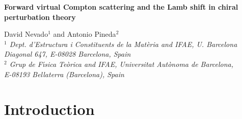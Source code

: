 \documentclass[a4paper,12pt]{article}
\begin{document}
\begin{titlepage}
\begin{flushright}
\end{flushright}


\vspace{1cm}
\begin{center}
\begin{Large}
{\bf Forward virtual Compton scattering and the Lamb shift 
in chiral perturbation theory}\\[2cm] 
\end{Large} 
{\large David Nevado$^{1}$ and Antonio Pineda$^{2}$}\\
\vspace{0.5cm}
{\it $^{1}$ Dept. d'Estructura i Constituents de la Mat\`eria and IFAE,
U. Barcelona \\ Diagonal 647, E-08028 Barcelona, Spain}\\
\vspace{0.5cm}
{\it $^{2}$ Grup de F\'\i sica 
Te\`orica and IFAE, Universitat Aut\`onoma de Barcelona,\\ 
E-08193 Bellaterra (Barcelona), Spain}
\end{center}

\vspace{1cm}

\begin{abstract}
We compute the spin-independent 
structure functions of the forward virtual-photon Compton 
tensor of the proton at one loop using heavy baryon chiral  
perturbation theory and dispersion relations. We study 
 the relation between both approaches. We use these results 
to generalize some sum rules to virtual photon transfer momentum and 
relate them with sum rules in deep inelastic scattering. 
We then compute the leading chiral 
term of the polarizability correction to the 
 Lamb shift of the hydrogen and 
muonic hydrogen. We obtain $-{87.05}/{n^3}\,{\rm Hz}$ and $-{0.148}/{n^3}\,{\rm meV}$ 
for the correction to the hydrogen and muonic hydrogen Lamb shift respectively. 
\vspace{5mm} \\
\end{abstract}

\end{titlepage}
\vfill
\setcounter{footnote}{0} 
\vspace{1cm}

\section{Introduction}
\end{document}
